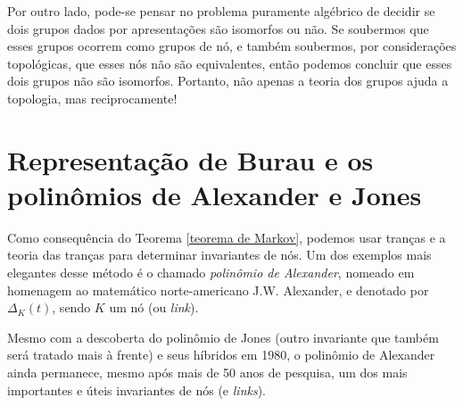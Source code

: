 	\par\vspace{0.3cm} Por outro lado, pode-se pensar no problema puramente algébrico de decidir 
	se dois grupos dados por apresentações são isomorfos ou não. Se soubermos que esses grupos 
	ocorrem como grupos de nó, e também soubermos, por considerações topológicas, que esses nós 
	não são equivalentes, então podemos concluir que esses dois grupos não são isomorfos. 
	Portanto, não apenas a teoria dos grupos ajuda a topologia, mas reciprocamente!
	
	\section{Representação de Burau e os polinômios de Alexander e Jones}
	Como consequência do Teorema \ref{teorema de Markov}, podemos usar tranças e a teoria 
	das tranças para determinar invariantes de nós. Um dos exemplos mais elegantes desse 
	método é o chamado \textit{polinômio de Alexander}, nomeado em homenagem ao matemático 
	norte-americano J.W. Alexander, e denotado por $\Delta_K(t)$, sendo $K$ um nó (ou \textit{link}).
	
	\par\vspace{0.3cm} Mesmo com a descoberta do polinômio de Jones (outro invariante que também 
	será tratado mais à frente) e seus híbridos em 1980, o polinômio de Alexander ainda permanece, 
	mesmo após mais de 50 anos de pesquisa, um dos mais importantes e úteis invariantes 
	de nós (e \textit{links}).
	
